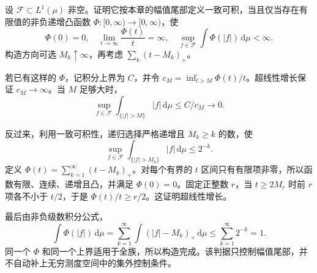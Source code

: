 \begin{exercise}\label{b1:ex:0508}
设 \(\mathcal F\subset L^1(\mu)\) 非空。证明它按本章的幅值尾部定义一致可积，当且仅当存在有限值的非负递增凸函数
\(\Phi:[0,\infty)\rightarrow[0,\infty)\)，使
\[
\Phi(0)=0,\quad
\lim_{t\to\infty}\frac{\Phi(t)}t=\infty,\quad
\sup_{f\in\mathcal F}\int\Phi(|f|)\,\mathrm d\mu<\infty.
\]
构造方向可选 \(M_k\uparrow\infty\)，再考虑 \(\sum_k(t-M_k)_+\)。
\end{exercise}
\begin{solution}
若已有这样的 \(\Phi\)，记积分上界为 \(C\)，并令
\(c_M=\inf_{t>M}\Phi(t)/t\)。超线性增长保证 \(c_M\to\infty\)。当 \(M\) 足够大时，
\[
\sup_{f\in\mathcal F}\int_{\{|f|>M\}}|f|\,\mathrm d\mu
\leq C/c_M\longrightarrow0.
\]

反过来，利用一致可积性，递归选择严格递增且 \(M_k\geq k\) 的数，使
\[
\sup_{f\in\mathcal F}\int_{\{|f|>M_k\}}|f|\,\mathrm d\mu\leq2^{-k}.
\]
定义 \(\Phi(t)=\sum_{k=1}^{\infty}(t-M_k)_+\)。对每个有界的 \(t\) 区间只有有限项非零，所以函数有限、连续、递增且凸，并满足 \(\Phi(0)=0\)。固定正整数 \(r\)，当 \(t\geq2M_r\) 时前 \(r\) 项各不小于 \(t/2\)，于是 \(\Phi(t)/t\geq r/2\)。这证明超线性增长。

最后由非负级数积分公式，
\[
\int\Phi(|f|)\,\mathrm d\mu
=\sum_{k=1}^{\infty}\int(|f|-M_k)_+\,\mathrm d\mu
\leq\sum_{k=1}^{\infty}2^{-k}=1.
\]
同一个 \(\Phi\) 和同一个上界适用于全族，所以构造完成。该判据只控制幅值尾部，并不自动补上无穷测度空间中的集外控制条件。
\end{solution}

